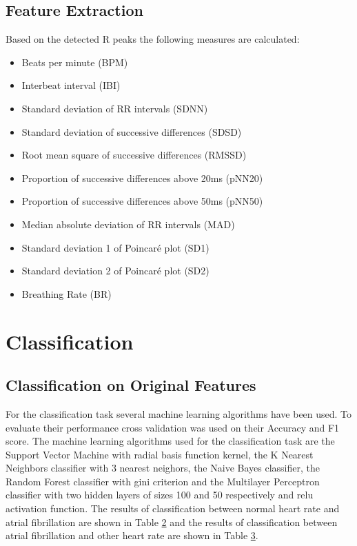 \documentclass[12pt, a4paper]{article}
\begin{document}
\subsection{Feature Extraction}
Based on the detected R peaks the following measures are calculated:
\begin{itemize}
	\item Beats per minute  (BPM)
	\item Interbeat interval (IBI)
	\item Standard deviation of RR intervals (SDNN)
	\item Standard deviation of successive differences (SDSD)
	\item Root mean square of successive differences (RMSSD)
	\item Proportion of successive differences above 20ms (pNN20)
	\item Proportion of successive differences above 50ms (pNN50)
	\item Median absolute deviation of RR intervals (MAD)
	\item Standard deviation 1 of Poincaré plot (SD1)
	\item Standard deviation 2 of Poincaré plot (SD2)
	\item Breathing Rate (BR)
\end{itemize}

\section{Classification}
\subsection{Classification on Original Features}
For the classification task several machine learning algorithms have been used. To evaluate their performance cross validation was used on their Accuracy and F1 score. The machine learning algorithms used for the classification task are the Support Vector Machine with radial basis function kernel, the K Nearest Neighbors classifier with 3 nearest neighors, the Naive Bayes classifier, the Random Forest classifier with gini criterion and the Multilayer Perceptron classifier with two hidden layers of sizes 100 and 50 respectively and relu activation function. The results of classification between normal heart rate and atrial fibrillation are shown in Table \hyperref[tab:Normal_Atrial]{2} and the results of classification between atrial fibrillation and other heart rate are shown in Table \hyperref[tab:Atrial_Other]{3}.
\end{document}
